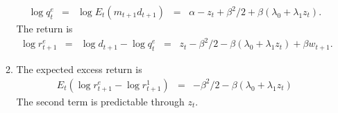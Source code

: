 \documentclass[11pt]{article}
\begin{document}
\begin{enumerate}
\begin{enumerate}
\begin{eqnarray*}
    \log q^e_t &=& \log E_t (m_{t+1} d_{t+1})
            \;\;=\;\; \alpha - z_t + \beta^2/2 + \beta ( \lambda_0+ \lambda_1 z_t) .
\end{eqnarray*}
The return is
\begin{eqnarray*}
    \log r^e_{t+1} &=& \log d_{t+1} - \log q^e_t
            \;\;=\;\;  z_t - \beta^2/2  -
                \beta (\lambda_0 + \lambda_1 z_t) + \beta w_{t+1}.
\end{eqnarray*}
\item  The expected excess return is
\begin{eqnarray*}
   E_t ( \log r^e_{t+1}- \log r^1_{t+1}) &=&
             - \beta^2/2  -  \beta (\lambda_0 + \lambda_1 z_t)
\end{eqnarray*}
The second term is predictable through $z_t$.
\end{enumerate}

\end{enumerate}


\end{document}
